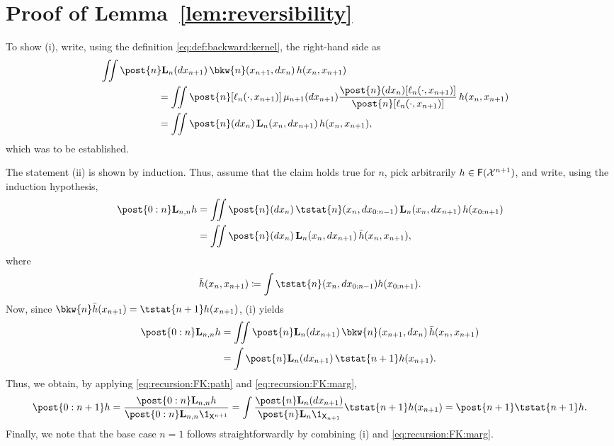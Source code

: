 \section{Proof of Lemma~\ref{lem:reversibility}}
\label{sec:proof:lem:reversibility}

To show (i), write, using the definition \eqref{eq:def:backward:kernel}, the right-hand side as 
\begin{align*}
\lefteqn{\iint \post{n} \uk{n}(\rmd x_{n + 1}) \, \bkw{n}(x_{n + 1}, \rmd x_n) \, h(x_n, x_{n + 1})} \hspace{20mm} \\
&= \iint \post{n}[\ud{n}(\cdot, x_{n + 1})] \, \mu_{n + 1}(\rmd x_{n + 1}) \frac{\post{n}(\rmd x_n) [\ud{n}(\cdot, x_{n + 1})]}{\post{n}[\ud{n}(\cdot, x_{n + 1})]} \, h(x_n, x_{n + 1}) \\
&= \iint \post{n}(\rmd x_n) \, \uk{n}(x_n, \rmd x_{n + 1}) \, h(x_n, x_{n + 1}), 
\end{align*}
which was to be established. 

The statement (ii) is shown by induction. Thus, assume that the claim holds true for $n$, pick arbitrarily $h \in \mathsf{F}(\mathcal{X}^{n + 1})$, and write, using the induction hypothesis, 
\begin{align*}
\post{0:n} \uk{n, n} h &= \iint \post{n}(\rmd x_n) \, \tstat{n}(x_n, \rmd x_{0:n - 1}) \, \uk{n}(x_n, \rmd x_{n + 1}) \, h(x_{0:n + 1}) \\
&= \iint \post{n}(\rmd x_n) \, \uk{n}(x_n, \rmd x_{n + 1}) \, \bar{h}(x_n, x_{n + 1}), 
\end{align*}
where 
$$
\bar{h}(x_n, x_{n + 1}) \eqdef \int \tstat{n}(x_n, \rmd x_{0:n - 1}) h(x_{0:n + 1}). 
$$
Now, since $\bkw{n} \bar{h}(x_{n + 1}) = \tstat{n + 1} h(x_{n + 1})$, (i) yields
\begin{align*} 
\post{0:n} \uk{n, n} h 
&= \iint \post{n} \uk{n}(\rmd x_{n + 1}) \, \bkw{n}(x_{n + 1}, \rmd x_n) \, \bar{h}(x_n, x_{n + 1}) \\
&= \int \post{n} \uk{n}(\rmd x_{n + 1}) \, \tstat{n + 1} h(x_{n + 1}). 
\end{align*}
Thus, we obtain, by applying \eqref{eq:recursion:FK:path} and \eqref{eq:recursion:FK:marg},  
$$
\post{0:n + 1} h = \frac{\post{0:n} \uk{n, n} h}{\post{0:n} \uk{n, n} \1_{\Xset^{n+1}}} 
= \int \frac{\post{n} \uk{n}(\rmd x_{n + 1})}{\post{n} \uk{n} \1_{\Xset_{n + 1}}} \tstat{n + 1} h(x_{n + 1}) = \post{n + 1} \tstat{n + 1} h. 
$$
Finally, we note that the base case $n = 1$ follows straightforwardly by combining (i) and \eqref{eq:recursion:FK:marg}. 
